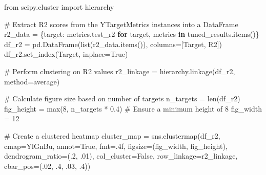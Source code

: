 \documentclass[
  letterpaper,
  DIV=11,
  numbers=noendperiod]{scrartcl}
\newenvironment{Shaded}{\begin{snugshade}}{\end{snugshade}}
\newcommand{\BuiltInTok}[1]{\textcolor[rgb]{0.00,0.23,0.31}{#1}}
\newcommand{\CommentTok}[1]{\textcolor[rgb]{0.37,0.37,0.37}{#1}}
\newcommand{\ControlFlowTok}[1]{\textcolor[rgb]{0.00,0.23,0.31}{\textbf{#1}}}
\newcommand{\DecValTok}[1]{\textcolor[rgb]{0.68,0.00,0.00}{#1}}
\newcommand{\FloatTok}[1]{\textcolor[rgb]{0.68,0.00,0.00}{#1}}
\newcommand{\ImportTok}[1]{\textcolor[rgb]{0.00,0.46,0.62}{#1}}
\newcommand{\KeywordTok}[1]{\textcolor[rgb]{0.00,0.23,0.31}{\textbf{#1}}}
\newcommand{\NormalTok}[1]{\textcolor[rgb]{0.00,0.23,0.31}{#1}}
\newcommand{\OperatorTok}[1]{\textcolor[rgb]{0.37,0.37,0.37}{#1}}
\newcommand{\StringTok}[1]{\textcolor[rgb]{0.13,0.47,0.30}{#1}}
\newcommand{\VariableTok}[1]{\textcolor[rgb]{0.07,0.07,0.07}{#1}}
\begin{document}
\begin{Shaded}
\begin{Highlighting}[]
\ImportTok{from}\NormalTok{ scipy.cluster }\ImportTok{import}\NormalTok{ hierarchy}

\CommentTok{\# Extract R2 scores from the YTargetMetrics instances into a DataFrame}
\NormalTok{r2\_data }\OperatorTok{=}\NormalTok{ \{target: metrics.test\_r2 }\ControlFlowTok{for}\NormalTok{ target, metrics }\KeywordTok{in}\NormalTok{ tuned\_results.items()\}}
\NormalTok{df\_r2 }\OperatorTok{=}\NormalTok{ pd.DataFrame(}\BuiltInTok{list}\NormalTok{(r2\_data.items()), columns}\OperatorTok{=}\NormalTok{[}\StringTok{\textquotesingle{}Target\textquotesingle{}}\NormalTok{, }\StringTok{\textquotesingle{}R2\textquotesingle{}}\NormalTok{])}
\NormalTok{df\_r2.set\_index(}\StringTok{\textquotesingle{}Target\textquotesingle{}}\NormalTok{, inplace}\OperatorTok{=}\VariableTok{True}\NormalTok{)}

\CommentTok{\# Perform clustering on R2 values}
\NormalTok{r2\_linkage }\OperatorTok{=}\NormalTok{ hierarchy.linkage(df\_r2, method}\OperatorTok{=}\StringTok{\textquotesingle{}average\textquotesingle{}}\NormalTok{)}

\CommentTok{\# Calculate figure size based on number of targets}
\NormalTok{n\_targets }\OperatorTok{=} \BuiltInTok{len}\NormalTok{(df\_r2)}
\NormalTok{fig\_height }\OperatorTok{=} \BuiltInTok{max}\NormalTok{(}\DecValTok{8}\NormalTok{, n\_targets }\OperatorTok{*} \FloatTok{0.4}\NormalTok{)  }\CommentTok{\# Ensure a minimum height of 8}
\NormalTok{fig\_width }\OperatorTok{=} \DecValTok{12}

\CommentTok{\# Create a clustered heatmap}
\NormalTok{cluster\_map }\OperatorTok{=}\NormalTok{ sns.clustermap(df\_r2, }
\NormalTok{                             cmap}\OperatorTok{=}\StringTok{\textquotesingle{}YlGnBu\textquotesingle{}}\NormalTok{, }
\NormalTok{                             annot}\OperatorTok{=}\VariableTok{True}\NormalTok{, }
\NormalTok{                             fmt}\OperatorTok{=}\StringTok{\textquotesingle{}.4f\textquotesingle{}}\NormalTok{,}
\NormalTok{                             figsize}\OperatorTok{=}\NormalTok{(fig\_width, fig\_height),}
\NormalTok{                             dendrogram\_ratio}\OperatorTok{=}\NormalTok{(}\FloatTok{.2}\NormalTok{, }\FloatTok{.01}\NormalTok{),}
\NormalTok{                             col\_cluster}\OperatorTok{=}\VariableTok{False}\NormalTok{,}
\NormalTok{                             row\_linkage}\OperatorTok{=}\NormalTok{r2\_linkage,}
\NormalTok{                             cbar\_pos}\OperatorTok{=}\NormalTok{(}\FloatTok{.02}\NormalTok{, }\FloatTok{.4}\NormalTok{, }\FloatTok{.03}\NormalTok{, }\FloatTok{.4}\NormalTok{))}


\end{Highlighting}
\end{Shaded}
\end{document}
